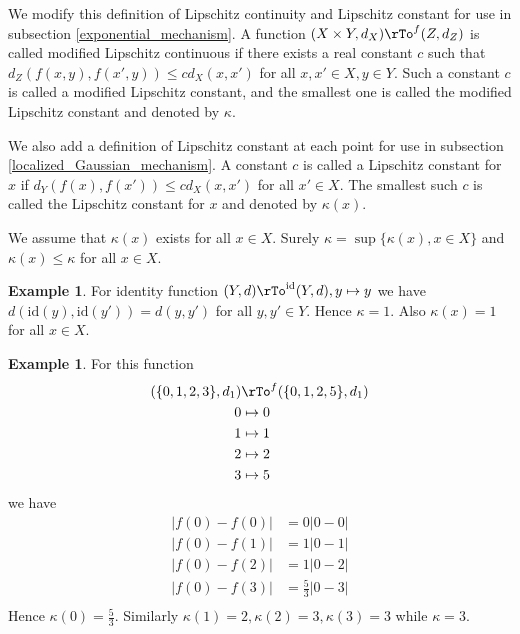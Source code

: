 \documentclass[12pt]{amsart}
\theoremstyle{definition}
\newtheorem{example}[theorem]{Example}
\begin{document}
We modify this definition of Lipschitz continuity and Lipschitz constant for use in subsection \ref{exponential_mechanism}.
\dfn \label{modified_Lipschitz_function} A function $(X \times Y, d_X) \rTo^f (Z, d_Z)$ is called modified Lipschitz continuous if there exists a real constant $c$ such that $d_Z(f(x, y), f(x', y)) \leq c d_X(x, x')$ for all $x, x' \in X, y \in Y$. Such a constant $c$ is called a modified Lipschitz constant, and the smallest one is called the modified Lipschitz constant and denoted by $\kappa$.

We also add a definition of Lipschitz constant at each point for use in subsection \ref{localized_Gaussian_mechanism}.
\dfn \label{localized_Lipschitz_constant} A constant $c$ is called a Lipschitz constant for $x$ if $d_Y(f(x), f(x')) \leq c d_X(x, x')$ for all $x' \in X$. The smallest such $c$ is called the Lipschitz constant for $x$ and denoted by $\kappa(x)$.

We assume that $\kappa(x)$ exists for all $x \in X$. Surely $\kappa = \sup \{\kappa(x), x \in X\}$ and $\kappa(x) \leq \kappa$ for all $x \in X$.

\begin{example} \label{identity_function_Lipschitz} For identity function $(Y, d) \rTo^{\text{id}} (Y, d), y \mapsto y$ we have $d(\text{id}(y), \text{id}(y')) = d(y, y')$ for all $y, y' \in Y$. Hence $\kappa = 1$. Also $\kappa(x) = 1$ for all $x \in X$.
\end{example}

\begin{example} \label{Lipschitz_contants} For this function
\begin{align*}
(\{0, 1, 2, 3\}, d_1) & \rTo^f (\{0, 1, 2, 5\}, d_1) \\
0 & \mapsto 0 \\
1 & \mapsto 1 \\
2 & \mapsto 2 \\
3 & \mapsto 5 \\
\end{align*}
we have
\begin{align*}
|f(0) - f(0)| & = 0 |0 - 0| \\
|f(0) - f(1)| & = 1 |0 - 1| \\
|f(0) - f(2)| & = 1 |0 - 2| \\
|f(0) - f(3)| & = \frac{5}{3} |0 - 3| \\
\end{align*}
Hence $\kappa(0) = \frac{5}{3}$. Similarly $\kappa(1) = 2, \kappa(2) = 3, \kappa(3) = 3$ while $\kappa = 3$.
\end{example}
\end{document}
